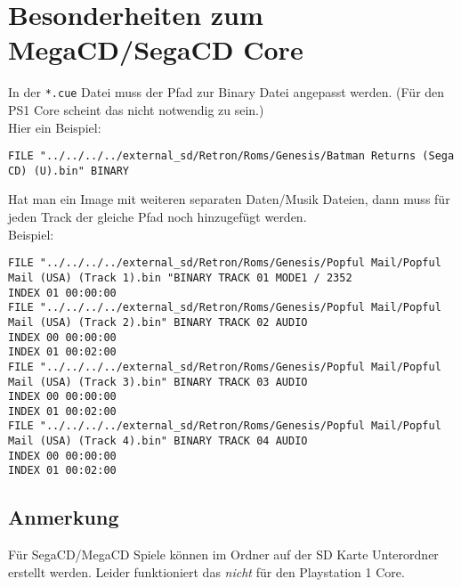 \documentclass[german]{retronlabo-manual}
\begin{document}
\glsaddallunused
\printglossary[title=Dateiformate, toctitle=Unterst\"utzte Dateiformate f\"ur ROMs, type=file-type, nonumberlist]

\section{Besonderheiten zum MegaCD/SegaCD Core}

In der \texttt{*.cue} Datei muss der Pfad zur Binary Datei angepasst werden. (F\"ur den PS1 Core scheint das nicht notwendig zu sein.) \\
Hier ein Beispiel: \\
\begin{lstlisting}[breaklines]
FILE "../../../../external_sd/Retron/Roms/Genesis/Batman Returns (Sega CD) (U).bin" BINARY
\end{lstlisting}

Hat man ein Image mit weiteren separaten Daten/Musik Dateien, dann muss f\"ur jeden Track der gleiche Pfad noch hinzugef\"ugt werden. \\
Beispiel: \\
\begin{lstlisting}[breaklines=true]
FILE "../../../../external_sd/Retron/Roms/Genesis/Popful Mail/Popful Mail (USA) (Track 1).bin "BINARY TRACK 01 MODE1 / 2352
INDEX 01 00:00:00
FILE "../../../../external_sd/Retron/Roms/Genesis/Popful Mail/Popful Mail (USA) (Track 2).bin" BINARY TRACK 02 AUDIO
INDEX 00 00:00:00
INDEX 01 00:02:00
FILE "../../../../external_sd/Retron/Roms/Genesis/Popful Mail/Popful Mail (USA) (Track 3).bin" BINARY TRACK 03 AUDIO
INDEX 00 00:00:00
INDEX 01 00:02:00
FILE "../../../../external_sd/Retron/Roms/Genesis/Popful Mail/Popful Mail (USA) (Track 4).bin" BINARY TRACK 04 AUDIO
INDEX 00 00:00:00
INDEX 01 00:02:00
\end{lstlisting}

\subsection{Anmerkung}

F\"ur SegaCD/MegaCD Spiele k\"onnen im  Ordner auf der SD Karte Unterordner erstellt werden. Leider funktioniert das \emph{nicht} f\"ur den Playstation 1 Core.


\BackMatter
\end{document}
